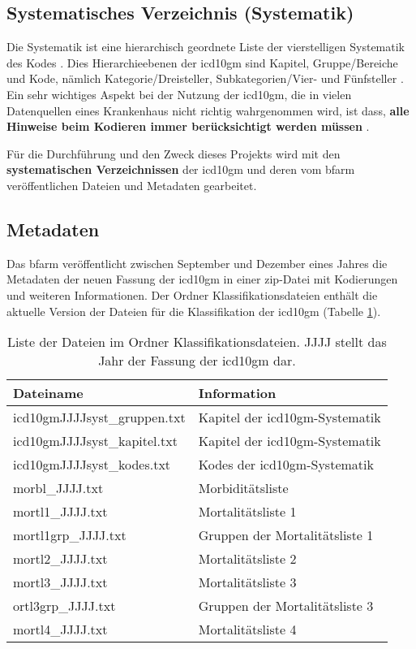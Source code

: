 \subsection{Systematisches Verzeichnis (Systematik)} 
Die Systematik ist eine hierarchisch geordnete Liste der vierstelligen Systematik des Kodes \cite{icd10syst, icd10systauf}. Dies Hierarchieebenen der \ac{icd10gm} sind Kapitel, Gruppe/Bereiche und Kode, nämlich Kategorie/Dreisteller, Subkategorien/Vier- und Fünfsteller \cite{icd10systauf}. Ein sehr wichtiges Aspekt bei der Nutzung der \ac{icd10gm}, die in vielen Datenquellen eines Krankenhaus nicht richtig wahrgenommen wird, ist dass, \textbf{alle Hinweise beim Kodieren immer berücksichtigt werden müssen} \cite{icd10systauf}.

Für die Durchführung und den Zweck dieses Projekts wird mit den \textbf{systematischen Verzeichnissen} der \ac{icd10gm} und deren vom \ac{bfarm} veröffentlichen Dateien und Metadaten gearbeitet. 

\subsection{Metadaten}
Das \ac{bfarm} veröffentlicht zwischen September und Dezember eines Jahres die Metadaten der neuen Fassung der \ac{icd10gm} in einer \ac{zip}-Datei mit Kodierungen und weiteren Informationen. Der Ordner Klassifikationsdateien enthält die aktuelle Version der Dateien für die Klassifikation der \ac{icd10gm} (Tabelle \ref{tab:classfiles}).

\begin{table}[ht]
	\centering
	\small
	\caption[Inhalt im Ordner Klassifikationsdateien ]{Liste der Dateien im Ordner Klassifikationsdateien. \glqq JJJJ\grqq{} stellt das Jahr der Fassung der \ac{icd10gm} dar.}
	\label{tab:classfiles}
	\begin{tabular}{|l|l|}
		\hline
		\rowcolor{lightgray} Dateiname & Information \\
		\hline 
		{\ttfamily icd10gmJJJJsyst\_gruppen.txt} &  Kapitel der \ac{icd10gm}-Systematik \\ \hline
		{\ttfamily icd10gmJJJJsyst\_kapitel.txt} & Kapitel der \ac{icd10gm}-Systematik \\ \hline
		{\ttfamily icd10gmJJJJsyst\_kodes.txt} & Kodes der \ac{icd10gm}-Systematik \\ \hline
		{\ttfamily morbl\_JJJJ.txt} & Morbiditätsliste  \\ \hline
		{\ttfamily mortl1\_JJJJ.txt} & Mortalitätsliste 1 \\ \hline
		{\ttfamily mortl1grp\_JJJJ.txt} & Gruppen der Mortalitätsliste 1 \\ \hline
		{\ttfamily mortl2\_JJJJ.txt} & Mortalitätsliste 2 \\ \hline
		{\ttfamily mortl3\_JJJJ.txt} & Mortalitätsliste 3 \\ \hline
		{\ttfamily ortl3grp\_JJJJ.txt} & Gruppen der Mortalitätsliste 3 \\ \hline
		{\ttfamily mortl4\_JJJJ.txt} & Mortalitätsliste 4 \\ \hline		
	\end{tabular}
\end{table}

